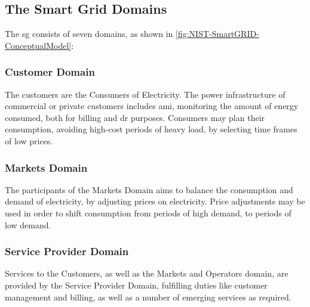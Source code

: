






\subsection{The Smart Grid Domains}




The \acrshort{sg} consists of seven domains, as shown in \figureautorefname { }\ref{fig:NIST-SmartGRID-ConceptualModel}:


    \subsubsection{Customer Domain} The customers are the Consumers of Electricity.
    The power infrastructure of commercial or private customers includes \acrfull{ami}, monitoring the amount of energy consumed, both for billing and \acrfull{dr} purposes. Consumers may plan their consumption, avoiding high-cost periods of heavy load, by  selecting time frames of low prices.
    \subsubsection{Markets Domain} The participants of the Markets Domain aims to balance the consumption and demand of electricity, by adjusting prices on electricity. Price adjustments may be used in order to shift consumption from periods of high demand, to periods of low demand.     
    \subsubsection{Service Provider Domain} Services to the Customers,  as well as the Markets and Operators domain, are provided by the Service Provider Domain, fulfilling duties like customer management and billing, as well as a number of emerging services as required. 
